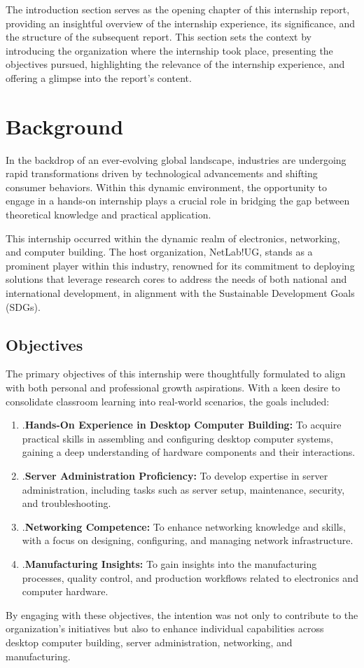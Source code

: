 The introduction section serves as the opening chapter of this internship report, providing an insightful overview of the internship experience, its significance, and the structure of the subsequent report. This section sets the context by introducing the organization where the internship took place, presenting the objectives pursued, highlighting the relevance of the internship experience, and offering a glimpse into the report's content.

\section{Background}

In the backdrop of an ever-evolving global landscape, industries are undergoing rapid transformations driven by technological advancements and shifting consumer behaviors. Within this dynamic environment, the opportunity to engage in a hands-on internship plays a crucial role in bridging the gap between theoretical knowledge and practical application.

This internship occurred within the dynamic realm of electronics, networking, and computer building. The host organization, NetLab!UG, stands as a prominent player within this industry, renowned for its commitment to deploying solutions that leverage research cores to address the needs of both national and international development, in alignment with the Sustainable Development Goals (SDGs).
\subsection{Objectives}

The primary objectives of this internship were thoughtfully formulated to align with both personal and professional growth aspirations. With a keen desire to consolidate classroom learning into real-world scenarios, the goals included:
\begin{enumerate}
    \item.\textbf{Hands-On Experience in Desktop Computer Building:} To acquire practical skills in assembling and configuring desktop computer systems, gaining a deep understanding of hardware components and their interactions.

    \item.\textbf{Server Administration Proficiency:} To develop expertise in server administration, including tasks such as server setup, maintenance, security, and troubleshooting.

    \item.\textbf{Networking Competence:} To enhance networking knowledge and skills, with a focus on designing, configuring, and managing network infrastructure.

    \item.\textbf{Manufacturing Insights:} To gain insights into the manufacturing processes, quality control, and production workflows related to electronics and computer hardware.
\end{enumerate}
By engaging with these objectives, the intention was not only to contribute to the organization's initiatives but also to enhance individual capabilities across desktop computer building, server administration, networking, and manufacturing.

